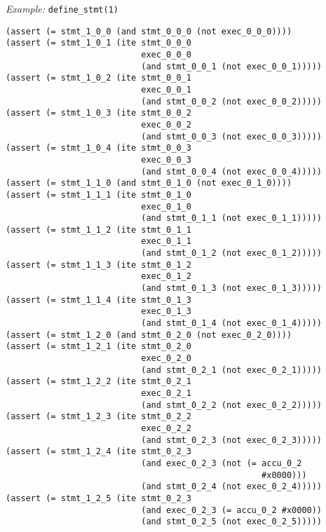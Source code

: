 \noindent
\emph{Example:} \lstinline[style=c++]{define_stmt(1)}

\newpage

\begin{lstlisting}[language=SMTLib]
(assert (= stmt_1_0_0 (and stmt_0_0_0 (not exec_0_0_0))))
(assert (= stmt_1_0_1 (ite stmt_0_0_0
                           exec_0_0_0
                           (and stmt_0_0_1 (not exec_0_0_1)))))
(assert (= stmt_1_0_2 (ite stmt_0_0_1
                           exec_0_0_1
                           (and stmt_0_0_2 (not exec_0_0_2)))))
(assert (= stmt_1_0_3 (ite stmt_0_0_2
                           exec_0_0_2
                           (and stmt_0_0_3 (not exec_0_0_3)))))
(assert (= stmt_1_0_4 (ite stmt_0_0_3
                           exec_0_0_3
                           (and stmt_0_0_4 (not exec_0_0_4)))))
(assert (= stmt_1_1_0 (and stmt_0_1_0 (not exec_0_1_0))))
(assert (= stmt_1_1_1 (ite stmt_0_1_0
                           exec_0_1_0
                           (and stmt_0_1_1 (not exec_0_1_1)))))
(assert (= stmt_1_1_2 (ite stmt_0_1_1
                           exec_0_1_1
                           (and stmt_0_1_2 (not exec_0_1_2)))))
(assert (= stmt_1_1_3 (ite stmt_0_1_2
                           exec_0_1_2
                           (and stmt_0_1_3 (not exec_0_1_3)))))
(assert (= stmt_1_1_4 (ite stmt_0_1_3
                           exec_0_1_3
                           (and stmt_0_1_4 (not exec_0_1_4)))))
(assert (= stmt_1_2_0 (and stmt_0_2_0 (not exec_0_2_0))))
(assert (= stmt_1_2_1 (ite stmt_0_2_0
                           exec_0_2_0
                           (and stmt_0_2_1 (not exec_0_2_1)))))
(assert (= stmt_1_2_2 (ite stmt_0_2_1
                           exec_0_2_1
                           (and stmt_0_2_2 (not exec_0_2_2)))))
(assert (= stmt_1_2_3 (ite stmt_0_2_2
                           exec_0_2_2
                           (and stmt_0_2_3 (not exec_0_2_3)))))
(assert (= stmt_1_2_4 (ite stmt_0_2_3
                           (and exec_0_2_3 (not (= accu_0_2
                                                   #x0000)))
                           (and stmt_0_2_4 (not exec_0_2_4)))))
(assert (= stmt_1_2_5 (ite stmt_0_2_3
                           (and exec_0_2_3 (= accu_0_2 #x0000))
                           (and stmt_0_2_5 (not exec_0_2_5)))))
\end{lstlisting}

